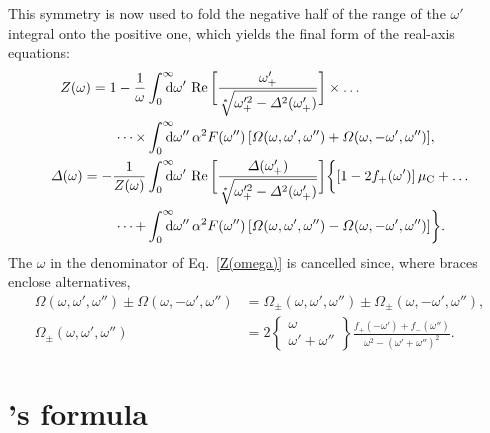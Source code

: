 This symmetry is now used to fold the negative half of the range of the
$\omega'$ integral onto the positive one, which yields the final form of the
real-axis  equations:
%
\begin{subequations} \label{real-axis Eliashberg equations}
    \begin{align} \notag
        Z(\omega) = 1 - \frac 1 \omega
        &\int \from 0 \till \infty \D \omega' \,
        \Re \bigg[
            \frac{\omega'_+}{\sqrt[*]{\omega'^2_+ - \Delta^2(\omega'_+)}}
        \bigg]
        \times \dots
        \\ \label{Z(omega)}
        \dots \times
        &\int \from 0 \till \infty \D \omega'' \, \alpha^2 F(\omega'') \,
        [ \Omega(\omega,  \omega', \omega'')
        + \Omega(\omega, -\omega', \omega'') ],
        \\ \notag
        \Delta(\omega) = -\frac 1 {Z(\omega)}
        &\int \from 0 \till \infty \D \omega' \,
        \Re \bigg[ \frac
            {\Delta(\omega'_+)}
            {\sqrt[*]{\omega'^2_+ - \Delta^2(\omega'_+)}}
        \bigg]
        \bigg \{
            [1 - 2 f_+(\omega')] \, \mu \sub C
            + \dots
            \\
            \dots +
            &\int \from 0 \till \infty \D \omega'' \, \alpha^2 F(\omega'') \,
            [ \Omega(\omega,  \omega', \omega'')
            - \Omega(\omega, -\omega', \omega'') ]
        \bigg \}.
    \end{align}
\end{subequations}
%
The $\omega$ in the denominator of Eq.~\ref{Z(omega)} is cancelled since, where
braces enclose alternatives,
%
\begin{align*}
    \Omega    (\omega,  \omega', \omega'') \pm
    \Omega    (\omega, -\omega', \omega'') &=
    \Omega_\pm(\omega,  \omega', \omega'') \pm
    \Omega_\pm(\omega, -\omega', \omega''),
    \\
    \Omega_\pm(\omega,  \omega', \omega'') &=
    2 \begin{Bmatrix} \omega \\ \omega' + \omega'' \end{Bmatrix}
    \frac{f_+(-\omega') + f_-(\omega'')}{\omega^2 -(\omega' + \omega'')^2}.
\end{align*}

\section{'s formula}


